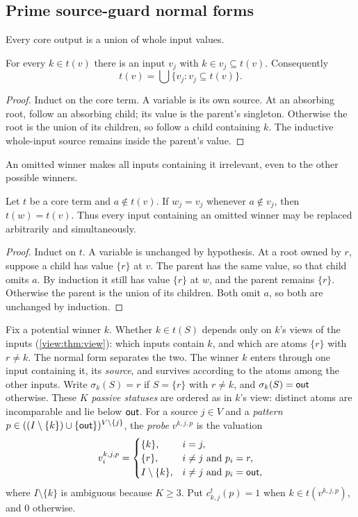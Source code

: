 \subsection{Prime source-guard normal forms}\label{app:core-source-guards}

Every core output is a union of whole input values.

\begin{proposition}\label{core:prop:whole-inputs}
For every $k\in t(v)$ there is an input $v_j$ with
$k\in v_j\subseteq t(v)$. Consequently
\[
 t(v)=\bigcup\{v_j:v_j\subseteq t(v)\}.
\]
\end{proposition}
\begin{proof}
Induct on the core term. A variable is its own source. At an absorbing
root, follow an absorbing child; its value is the parent's singleton.
Otherwise the root is the union of its children, so follow a child
containing $k$. The inductive whole-input source remains inside the
parent's value.
\end{proof}

An omitted winner makes all inputs containing it irrelevant, even to the
other possible winners.

\begin{proposition}\label{core:prop:omission}
Let $t$ be a core term and $a\notin t(v)$. If $w_j=v_j$ whenever
$a\notin v_j$, then $t(w)=t(v)$. Thus every input containing an omitted
winner may be replaced arbitrarily and simultaneously.
\end{proposition}
\begin{proof}
Induct on $t$. A variable is unchanged by hypothesis. At a root owned by
$r$, suppose a child has value $\{r\}$ at $v$. The parent has the same
value, so that child omits $a$. By induction it still has value $\{r\}$
at $w$, and the parent remains $\{r\}$. Otherwise the parent is the
union of its children. Both omit $a$, so both are unchanged by induction.
\end{proof}

Fix a potential winner $k$. Whether $k\in t(S)$ depends only on $k$'s
views of the inputs (\cref{view:thm:view}): which inputs contain $k$,
and which are atoms $\{r\}$ with $r\ne k$. The normal form separates
the two. The winner $k$ enters through one input containing it, its
\emph{source}, and survives according to the atoms among the other
inputs. Write $\sigma_k(S)=r$ if $S=\{r\}$ with $r\ne k$, and
$\sigma_k(S)=\mathsf{out}$ otherwise. These $K$ \emph{passive statuses} are
ordered as in $k$'s view: distinct atoms are incomparable and lie below
$\mathsf{out}$. For a source $j\in V$ and a \emph{pattern}
$p\in((I\setminus\{k\})\cup\{\mathsf{out}\})^{V\setminus\{j\}}$, the \emph{probe}
$v^{k,j,p}$ is the valuation
\[
 v^{k,j,p}_i=\begin{cases}
 \{k\},&i=j,\\
 \{r\},&i\ne j\text{ and }p_i=r,\\
 I\setminus\{k\},&i\ne j\text{ and }p_i=\mathsf{out},
 \end{cases}
\]
where $I\setminus\{k\}$ is ambiguous because $K\geq3$.
Put $c^t_{k,j}(p)=1$ when $k\in t(v^{k,j,p})$, and $0$ otherwise.

